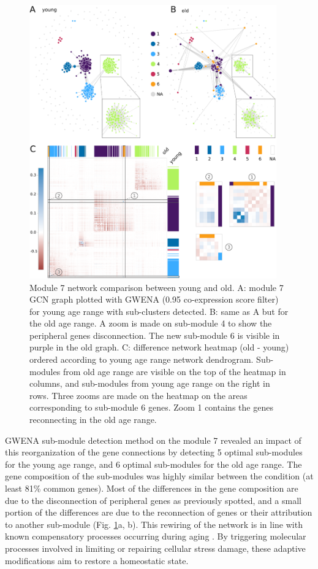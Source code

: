 \begin{figure}[!ht]
    \centering
    \includegraphics[width=0.95\textwidth]{img/chap1/figure_4.pdf}
    \caption[Module 7 network comparison between young and old]{Module 7 network comparison between young and old. A: module 7 GCN graph plotted with GWENA (0.95 co-expression score filter) for young age range with sub-clusters detected. B: same as A but for the old age range. A zoom is made on sub-module 4 to show the peripheral genes disconnection. The new sub-module 6 is visible in purple in the old graph. C: difference network heatmap (old - young) ordered according to young age range network dendrogram. Sub-modules from old age range are visible on the top of the heatmap in columns, and sub-modules from young age range on the right in rows. Three zooms are made on the heatmap on the areas corresponding to sub-module 6 genes. Zoom \textcircled{\small{1}} contains the genes reconnecting in the old age range.}
    \label{fig:fig_graph_diff_cluster}
\end{figure}

GWENA sub-module detection method on the module 7 revealed an impact of this reorganization of the gene connections by detecting 5 optimal sub-modules for the young age range, and 6 optimal sub-modules for the old age range. The gene composition of the sub-modules was highly similar between the condition (at least 81\% common genes). Most of the differences in the gene composition are due to the disconnection of peripheral genes as previously spotted, and a small portion of the differences are due to the reconnection of genes or their attribution to another sub-module (Fig. \ref{fig:fig_graph_diff_cluster}a, b). This rewiring of the network is in line with known compensatory processes occurring during aging . By triggering molecular processes involved in limiting or repairing cellular stress damage, these adaptive modifications aim to restore a homeostatic state.

